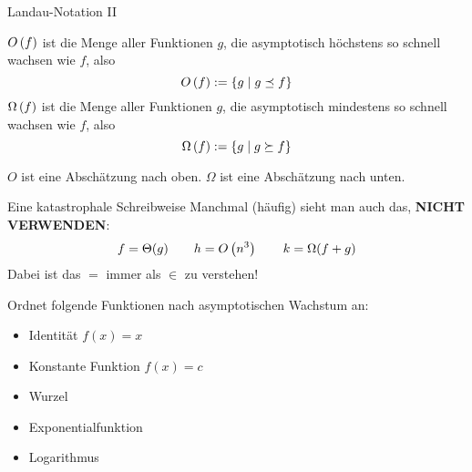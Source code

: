\begin{frame}{Landau-Notation II}
	\begin{Definition}
		$O\left(f\right)$ ist die Menge aller Funktionen $g$, die asymptotisch höchstens so schnell wachsen wie $f$, also $$O\left(f\right) := \{ g \mid g \preceq f \}$$
		$\Omega\left(f\right)$ ist die Menge aller Funktionen $g$, die asymptotisch mindestens so schnell wachsen wie $f$, also $$\Omega\left(f\right) := \{ g \mid g \succeq f \}$$
	\end{Definition} \pause
	\impl $O$ ist eine Abschätzung nach oben. $\Omega$ ist eine Abschätzung nach unten.
\end{frame}



\begin{frame}{Eine katastrophale Schreibweise}
	Manchmal (häufig) sieht man auch das, \textbf{NICHT VERWENDEN}:
	$$f = \Theta(g) \qquad h = O\left(n^3\right) \qquad k = \Omega(f + g)$$
	\pause
	Dabei ist das $=$ immer als $\in$ zu verstehen!
\end{frame}

\begin{frame}{}
	Ordnet folgende Funktionen nach asymptotischen Wachstum an:
	\begin{itemize}
		\item Identität $f(x) = x$
		\item Konstante Funktion $f(x) =c$
		\item Wurzel
		\item Exponentialfunktion
		\item Logarithmus
	\end{itemize}
\end{frame}



